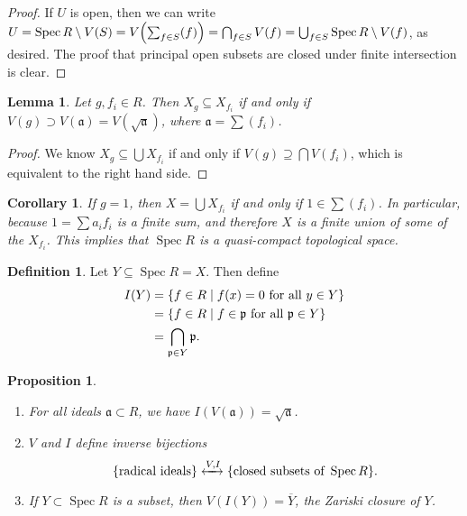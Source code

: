 \documentclass[leqno, openany]{memoir}
\newtheorem{cor}[thm]{Corollary}
\newtheorem{prop}[thm]{Proposition}
\newtheorem{lem}[thm]{Lemma}
\theoremstyle{definition}
\newtheorem{defn}[thm]{Definition}
\theoremstyle{remark}
\theoremstyle{plain}
\theoremstyle{definition}
\theoremstyle{remark}
\newcommand{\mf}[1]{\mathfrak{#1}}
\newcommand{\ol}[1]{\overline{#1}}
\DeclareMathOperator{\Spec}{Spec}
\begin{document}
\begin{proof}
    If $U$ is open, then we can write $U = \Spec R \setminus V(S) = V\qty(\sum_{f \in S} (f)) = \bigcap_{f \in S} V(f) = \bigcup_{f \in S} \Spec R \setminus V(f)$, as desired. The proof that principal open subsets are closed under finite intersection is clear.
\end{proof}

\begin{lem}
    Let $g, f_i \in R$. Then $X_g \subseteq X_{f_i}$ if and only if $V(g) \supset V(\mf{a}) = V(\sqrt{\mf{a}})$, where $\mf{a} = \sum (f_i)$.
\end{lem}

\begin{proof}
    We know $X_g \subseteq \bigcup X_{f_i}$ if and only if $V(g) \supseteq \bigcap V(f_i)$, which is equivalent to the right hand side.
\end{proof}

\begin{cor}
    If $g = 1$, then $X = \bigcup X_{f_i}$ if and only if $1 \in \sum (f_i)$. In particular, because $1 = \sum a_i f_i$ is a finite sum, and therefore $X$ is a finite union of some of the $X_{f_i}$. This implies that $\Spec R$ is a quasi-compact topological space.
\end{cor}

\begin{defn}
    Let $Y \subseteq \Spec R = X$. Then define
    \begin{align*}
        I(Y) &= \qty{f \in R \mid f(x) = 0 \text{ for all }y \in Y} \\
             &= \qty{f \in R \mid f \in \mf{p}\text{ for all } \mf{p} \in Y} \\
             &= \bigcap_{\mf{p} \in Y} \mf{p}.
    \end{align*}
\end{defn}

\begin{prop}
    \begin{enumerate}
        \item For all ideals $\mf{a} \subset R$, we have $I(V(\mf{a})) = \sqrt{\mf{a}}$.
        \item $V$ and $I$ define inverse bijections
            \[ \qty{\text{radical ideals}} \xleftrightarrow{V,I} \qty{\text{closed subsets of }\Spec R}. \]
        \item If $Y \subset \Spec R$ is a subset, then $V(I(Y)) = \ol{Y}$, the Zariski closure of $Y$.
    \end{enumerate}
\end{prop}
\end{document}
